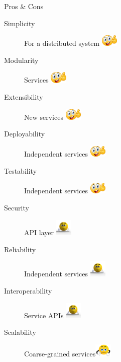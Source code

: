 \documentclass{slide}
\begin{document}
\begin{frame}{Pros \& Cons}
    \vspace{1mm}
    {\LARGE
    \begin{description}
        \item[Simplicity] For a distributed system \tabto{15em}\includegraphics[width=8mm]{../../shared/images/thumbs-up.png}
        \item[Modularity] Services \tabto{15em}\includegraphics[width=8mm]{../../shared/images/thumbs-up.png}
        \item[Extensibility] New services \tabto{15em}\includegraphics[width=8mm]{../../shared/images/thumbs-up.png}
        \item[Deployability] Independent services \tabto{15em}\includegraphics[width=8mm]{../../shared/images/thumbs-up.png}
        \item[Testability] Independent services \tabto{15em}\includegraphics[width=8mm]{../../shared/images/thumbs-up.png}
        \item[Security] API layer \tabto{15em}\includegraphics[trim=57 145 70 85,clip,width=8mm]{../../shared/images/neutral.png}
        \item[Reliability] Independent services \tabto{15em}\includegraphics[trim=57 145 70 85,clip,width=8mm]{../../shared/images/neutral.png}
        \item[Interoperability] Service APIs \tabto{15em}\includegraphics[trim=57 145 70 85,clip,width=8mm]{../../shared/images/neutral.png}
        \item[Scalability] Coarse-grained services\tabto{15em}\includegraphics[trim=22 19 22 12,clip,width=8mm]{../../shared/images/thumbs-down.png}
    \end{description}
    }
\end{frame}
\end{document}
